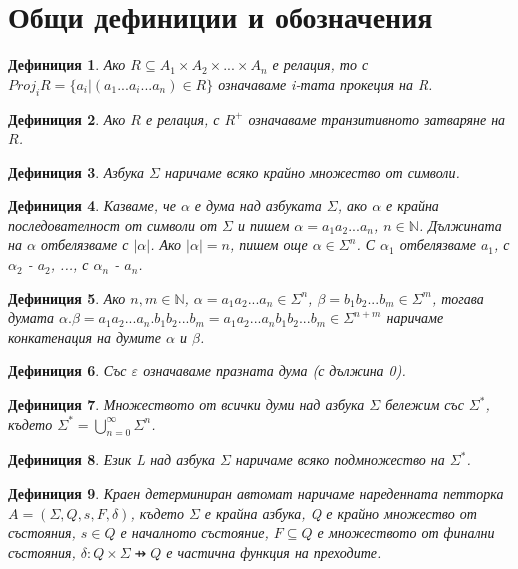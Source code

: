 \documentclass[a4paper,12pt]{article}
\newtheorem{defn}{Дефиниция}[section]
\begin{document}
\pagebreak

\section{Общи дефиниции и обозначения}

\begin{defn}
Ако $R \subseteq A_1 \times A_2 \times ... \times A_n$ е релация, то с $Proj_iR = \{a_i | (a_1...a_i...a_n) \in R\}$ означаваме i-тата прокеция на R.
\end{defn}

\begin{defn}
Ако $R$ е релация, с $R^+$ означаваме транзитивното затваряне на $R$.
\end{defn}

\begin{defn}
Азбука $\Sigma$ наричаме всяко крайно множество от символи.
\end{defn}

\begin{defn}
Казваме, че $\alpha$ е дума над азбуката $\Sigma$, ако $\alpha$ е крайна последователност от символи от $\Sigma$ и пишем $\alpha = a_1a_2...a_n$, $n \in \mathbb N$.
Дължината на $\alpha$ отбелязваме с $|\alpha|$. Ако $|\alpha| = n$, пишем още $\alpha \in \Sigma^n$.
С $\alpha_1$ отбелязваме $a_1$, с $\alpha_2$ - $a_2$, ..., с $\alpha_n$ - $a_n$.
\end{defn}

\begin{defn}
Ако $n, m \in \mathbb N$, $\alpha = a_1a_2...a_n \in \Sigma^n$, $\beta = b_1b_2...b_m \in \Sigma^m$, тогава думата
$\alpha . \beta = a_1a_2...a_n . b_1b_2...b_m = a_1a_2...a_nb_1b_2...b_m \in \Sigma^{n+m}$ наричаме конкатенация на думите $\alpha$ и $\beta$.
\end{defn}

\begin{defn}
Със $\varepsilon$ означаваме празната дума (с дължина 0).
\end{defn}

\begin{defn}
Множеството от всички думи над азбука $\Sigma$ бележим със $\Sigma^*$, където $\Sigma^* = \bigcup\limits_{n=0}^{\infty} \Sigma^n$.
\end{defn}

\begin{defn}
Език L над азбука $\Sigma$ наричаме всяко подмножество на $\Sigma^*$.
\end{defn}

\begin{defn}
Краен детерминиран автомат наричаме нареденната петторка $A = ( \Sigma, Q, s, F, \delta )$, където
$\Sigma$ е крайна азбука, Q е крайно множество от състояния, $s \in Q$ е началното състояние, $F \subseteq Q$ е множеството от финални състояния,
$\delta : Q \times \Sigma \pfun Q$ е частична функция на преходите.
\end{defn}
\end{document}
